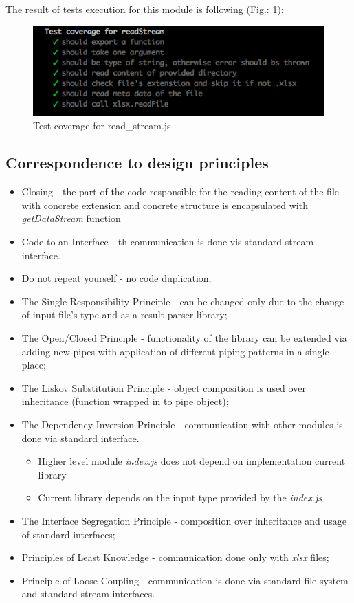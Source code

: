 The result of tests execution  for this module is following (Fig.: \ref{fig:testRead}):
\begin{figure}[H]
	\centering
	\includegraphics[width=\linewidth]{grafiken/testReadStream.png}
	\caption{Test coverage for read\_stream.js}
	\label{fig:testRead}
\end{figure}



\subsection{Correspondence to design principles}
\begin{itemize}
	\item Closing - the part of the code responsible for the reading content of the file with concrete extension and concrete structure is encapsulated with \textit{getDataStream} function
	\item Code to an Interface - th communication is done vis standard stream interface.
	\item Do not repeat yourself - no code duplication;
	\item The Single-Responsibility Principle - can be changed only due to the change of input file's type and as a result parser library;
	\item The Open/Closed Principle - functionality of the library can be extended via adding new pipes with application of different piping patterns in a single place;
	\item The Liskov Substitution Principle - object composition is used over inheritance (function wrapped in to pipe object);
	\item The Dependency-Inversion Principle - communication with other modules is done via standard interface.
		\begin{itemize}
			\item Higher level module \textit{index.js} does not depend on implementation current library
			\item Current library depends on the input type provided by the \textit{index.js}
		\end{itemize}
	\item The Interface Segregation Principle - composition over inheritance and usage of standard interfaces;
	\item Principles of Least Knowledge - communication done only with \textit{xlsx} files;
	\item Principle of Loose Coupling - communication is done via standard file system and standard stream interfaces.
\end{itemize}
